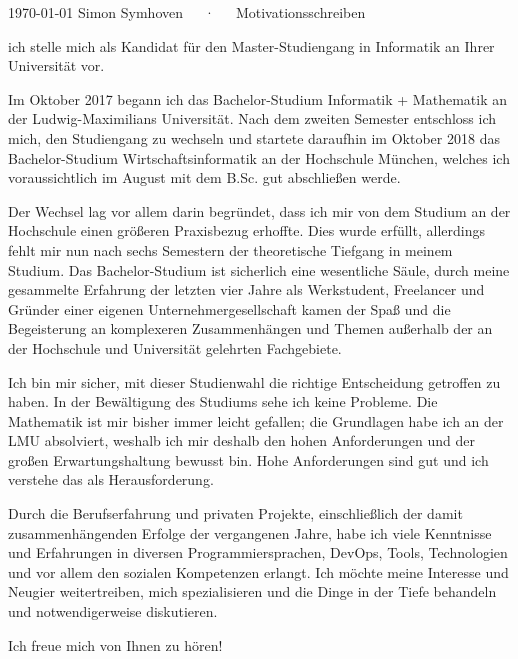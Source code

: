 \documentclass[11pt, a4paper]{awesome-cv}
\begin{document}
\makecvheader[R]

\makecvfooter
  {\today}
  {Simon Symhoven~~~·~~~Motivationsschreiben}
  {}

\makelettertitle

\begin{cvletter}

ich stelle mich als Kandidat für den Master-Studiengang in \glqq{}Informatik\grqq{} an Ihrer Universität vor.

Im Oktober 2017 begann ich das Bachelor-Studium \glqq{}Informatik + Mathematik\grqq{} an der Ludwig-Maximilians Universität. Nach dem zweiten Semester entschloss ich mich, den Studiengang zu wechseln und startete daraufhin im Oktober 2018 das Bachelor-Studium \glqq{}Wirtschaftsinformatik\grqq{} an der Hochschule München, welches ich voraussichtlich im August mit dem B.Sc. gut abschließen werde. 

Der Wechsel lag vor allem darin begründet, dass ich mir von dem Studium an der Hochschule einen größeren Praxisbezug erhoffte. Dies wurde erfüllt, allerdings fehlt mir nun nach sechs Semestern der theoretische Tiefgang in meinem Studium. Das Bachelor-Studium ist sicherlich eine wesentliche Säule, durch meine gesammelte Erfahrung der letzten vier Jahre als Werkstudent, Freelancer und Gründer einer eigenen Unternehmergesellschaft kamen der Spaß und die Begeisterung an komplexeren Zusammenhängen und Themen außerhalb der an der Hochschule und Universität gelehrten Fachgebiete. 

Ich bin mir sicher, mit dieser Studienwahl die richtige Entscheidung getroffen zu haben. In der Bewältigung des Studiums sehe ich keine Probleme. Die Mathematik ist mir bisher immer leicht gefallen; die Grundlagen habe ich an der LMU absolviert, weshalb ich mir deshalb den hohen Anforderungen und der großen Erwartungshaltung bewusst bin. Hohe Anforderungen sind gut und ich verstehe das als Herausforderung.  

Durch die Berufserfahrung und privaten Projekte, einschließlich der damit zusammenhängenden Erfolge der vergangenen Jahre, habe ich viele Kenntnisse und Erfahrungen in diversen Programmiersprachen, DevOps, Tools, Technologien und vor allem den sozialen Kompetenzen erlangt. Ich möchte meine Interesse und Neugier weitertreiben, mich spezialisieren und die Dinge in der Tiefe behandeln und notwendigerweise diskutieren.

Ich freue mich von Ihnen zu hören!
\end{cvletter}


\makeletterclosing
\end{document}
